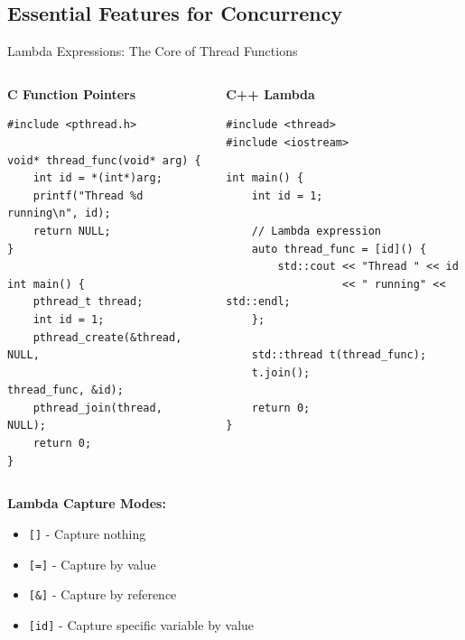 \subsection{Essential Features for Concurrency}
\begin{frame}[fragile]{ Lambda Expressions: The Core of Thread Functions}
	\begin{columns}
		\begin{column}{0.5\textwidth}
			\textbf{C Function Pointers}
			\begin{verbatim}
#include <pthread.h>

void* thread_func(void* arg) {
    int id = *(int*)arg;
    printf("Thread %d running\n", id);
    return NULL;
}

int main() {
    pthread_t thread;
    int id = 1;
    pthread_create(&thread, NULL,
                   thread_func, &id);
    pthread_join(thread, NULL);
    return 0;
}
			\end{verbatim}
		\end{column}
		\begin{column}{0.5\textwidth}
			\textbf{C++ Lambda}
			\begin{verbatim}
#include <thread>
#include <iostream>

int main() {
    int id = 1;

    // Lambda expression
    auto thread_func = [id]() {
        std::cout << "Thread " << id
                  << " running" << std::endl;
    };

    std::thread t(thread_func);
    t.join();

    return 0;
}
			\end{verbatim}
		\end{column}
	\end{columns}

	\vspace{0.5em}
	\textbf{Lambda Capture Modes:}
	\begin{itemize}
		\item \texttt{[]} - Capture nothing
		\item \texttt{[=]} - Capture by value
		\item \texttt{[\&]} - Capture by reference
		\item \texttt{[id]} - Capture specific variable by value
	\end{itemize}
\end{frame}


